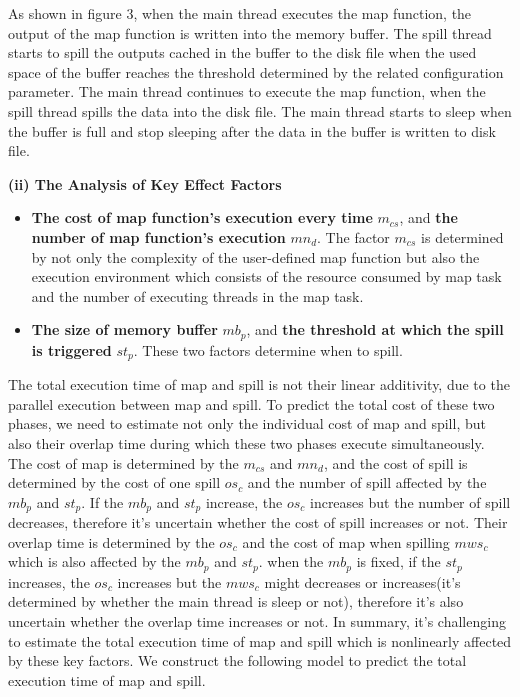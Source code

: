 As shown in figure 3, when the main thread executes the map function, the output of the map function is written into the memory buffer. The spill thread starts to spill the outputs cached in the buffer to the disk file when the used space of the buffer reaches the threshold determined by the related configuration parameter. The main thread continues to execute the map function, when the spill thread spills the data into the disk file. The main thread starts to sleep when the buffer is full and stop sleeping after the data in the buffer is written to disk file.

\noindent\textbf{(ii) The Analysis of Key Effect Factors}
\begin{itemize}
\item  \textbf{The cost of map function's execution every time} $m_{cs}$, and \textbf{the number of map function's execution} $mn_d$. The factor $m_{cs}$ is determined by not only the complexity of the user-defined map function but also the execution environment which consists of the resource consumed by map task and the number of executing threads in the map task.
\item  \textbf{The size of memory buffer} $mb_p$, and \textbf{the threshold at which the spill is triggered} $st_p$. These two factors determine when to spill.
\end{itemize}

The total execution time of map and spill is not their linear additivity, due to the parallel execution between map and spill. To predict the total cost of these two phases, we need to estimate not only the individual cost of map and spill, but also their overlap time during which these two phases execute simultaneously. The cost of map is determined by the $m_{cs}$ and $mn_d$, and the cost of spill is determined by the cost of one spill $os_c$ and the number of spill affected by the $mb_p$ and $st_p$. If the $mb_p$ and $st_p$ increase, the $os_c$ increases but the number of spill decreases, therefore it's uncertain whether the cost of spill increases or not. Their overlap time is determined by the $os_c$ and the cost of map when spilling $mws_c$ which is also affected by the $mb_p$ and $st_p$. when the $mb_p$ is fixed, if the $st_p$ increases, the $os_c$ increases but the $mws_c$ might decreases or increases(it's determined by whether the main thread is sleep or not), therefore it's also uncertain whether the overlap time increases or not. In summary, it's challenging to estimate the total execution time of map and spill which is nonlinearly affected by these key factors. We construct the following model to predict the total execution time of map and spill.


